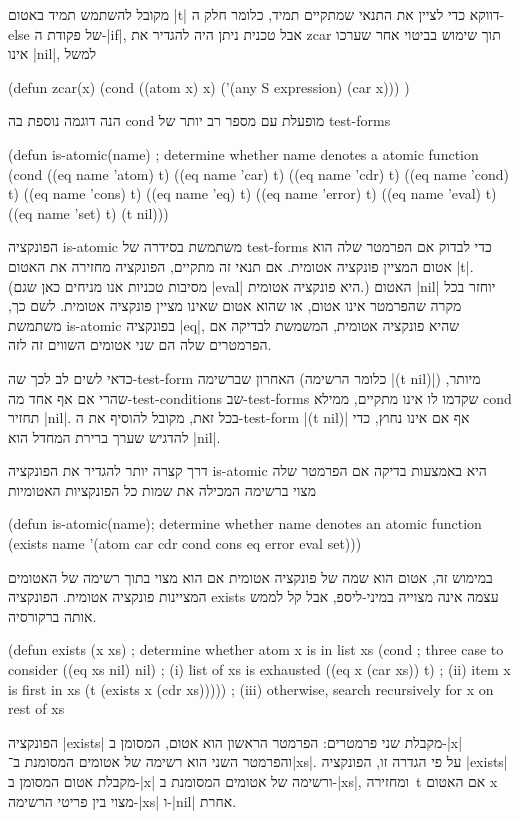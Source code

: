 מקובל להשתמש תמיד באטום \E|t| דווקא כדי לציין את התנאי שמתקיים תמיד, כלומר חלק
ה-else של פקודת ה-\E|if|, אבל טכנית ניתן היה להגדיר את zcar תוך שימוש בביטוי
אחר שערכו אינו \E|nil|, למשל
\begin{LISP}
(defun zcar(x)
  (cond ((atom x) x) ('(any S expression) (car x)))
)
\end{LISP}
הנה דוגמה נוספת בה cond מופעלת עם מספר רב יותר של test-forms
\begin{LISP}
(defun is-atomic(name) ; determine whether name denotes a atomic function
  (cond ((eq name 'atom) t)
        ((eq name 'car) t)
        ((eq name 'cdr) t)
        ((eq name 'cond) t)
        ((eq name 'cons) t)
        ((eq name 'eq) t)
        ((eq name 'error) t)
        ((eq name 'eval) t)
        ((eq name 'set) t)
        (t nil)))
\end{LISP}
הפונקציה is-atomic משתמשת בסידרה של test-forms כדי לבדוק אם הפרמטר שלה הוא
אטום המציין פונקציה אטומית. אם תנאי זה מתקיים, הפונקציה מחזירה את האטום
\E|t|. (מסיבות טכניות אנו מניחים כאן שגם \T|eval| היא פונקציה אטומית.)
האטום \E|nil| יוחזר בכל מקרה שהפרמטר אינו אטום, או שהוא אטום שאינו מציין
פונקציה אטומית. לשם כך, משתמשת
is-atomic בפונקציה \T|eq|, שהיא פונקציה אטומית, המשמשת לבדיקה אם הפרמטרים
שלה הם שני אטומים השווים זה לזה.

כדאי לשים לב לכך שה-test-form האחרון שברשימה (כלומר הרשימה \T|(t nil)|) מיותר,
שהרי אם אף אחד מה-test-conditions שב-test-forms שקדמו לו אינו מתקיים, ממילא
cond תחזיר \E|nil|. בכל זאת, מקובל להוסיף את ה-test-form \T|(t nil)| אף אם אינו
נחוץ, כדי להדגיש שערך ברירת המחדל הוא \E|nil|.

דרך קצרה יותר להגדיר את הפונקציה is-atomic היא באמצעות בדיקה אם הפרמטר
שלה מצוי ברשימה המכילה את שמות כל הפונקציות האטומיות
\begin{KERNEL}
(defun is-atomic(name); determine whether name denotes an atomic function
  (exists name '(atom car cdr cond cons eq error eval set)))
\end{KERNEL}
במימוש זה, אטום הוא שמה של פונקציה אטומית אם הוא מצוי בתוך רשימה של האטומים
המציינות פונקציה אטומית. הפונקציה exists עצמה אינה מצוייה במיני-ליספ, אבל
קל לממש אותה ברקורסיה.
\begin{LISP}
(defun exists (x xs) ; determine whether atom x is in list xs
  (cond ; three case to consider
    ((eq xs nil) nil) ; (i) list of xs is exhausted
    ((eq x (car xs)) t) ; (ii) item x is first in xs
    (t (exists x (cdr xs))))) ; (iii) otherwise, search recursively for x on rest of xs
\end{LISP}
הפונקציה \T|exists| מקבלת שני פרמטרים: הפרמטר הראשון הוא אטום, המסומן ב-\T|x|
והפרמטר השני הוא רשימה של אטומים המסומנת ב־\T|xs|. על פי הגדרה זו, הפונקציה
\T|exists| מקבלת אטום המסומן ב-\T|x| ורשימה של אטומים המסומנת ב-\T|xs|,
ומחזירה~t אם האטום x מצוי בין פריטי הרשימה-\T|xs| ו-\T|nil| אחרת.

